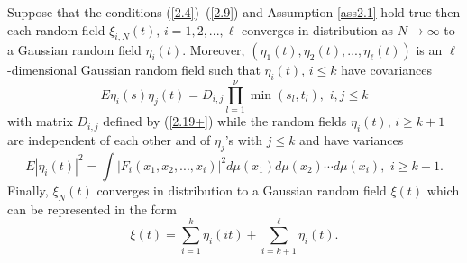 
\begin{theorem}\label{thm2.2}
Suppose that the conditions (\ref{2.4})--(\ref{2.9}) and Assumption \ref{ass2.1} 
hold true then each random field 
$\xi_{i,N}(t),\, i=1,2,...,\ell$ converges in distribution as $N\to\infty$ 
to a Gaussian random field $\eta_i(t)$. Moreover, 
$(\eta_1(t),\eta_2(t),...,\eta_\ell(t))$ is an $\ell$-dimensional Gaussian
random field such that $\eta_i(t),\, i\leq k$ have covariances 
\[
E\eta_i(s)\eta_j(t)=D_{i,j}\prod_{l=1}^\nu\min(s_l,t_l),\,\,i,j\leq k
\]
with matrix $D_{i,j}$ defined by (\ref{2.19+}) while the random
fields $\eta_i(t),\, i\geq k+1$ are independent of each other and of 
$\eta_j$'s with $j\leq k$ and have variances
\[
E|\eta_i(t)|^2=\int|F_i(x_1,x_2,...,x_i)|^2d\mu(x_1)d\mu(x_2)\cdots d\mu(x_i),\,\,
i\geq k+1.
\]
Finally, $\xi_N(t)$ converges in distribution to a Gaussian random field
$\xi(t)$ which can be represented in the form
\begin{equation}\label{2.20}
\xi(t)=\sum_{i=1}^k\eta_i(it)+\sum_{i=k+1}^\ell \eta_i(t).
\end{equation}
\end{theorem}

